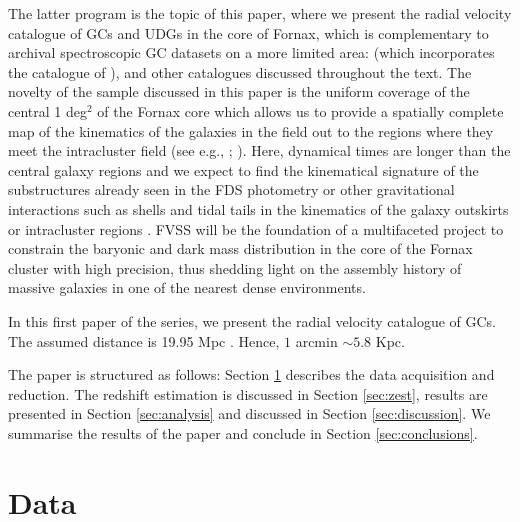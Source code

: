 \documentclass[usenatbib]{mnras}
\begin{document}
The latter program is the topic of this paper, where we present the radial 
velocity catalogue of GCs and UDGs in the core of Fornax, which is 
complementary to archival spectroscopic GC datasets on a more limited area: 
\citet{Schuberth} (which incorporates the catalogue of \citealt{Dirsch04}), 
\citet{Bergond07} and other catalogues discussed throughout the 
text. The novelty of the sample discussed in this paper is the uniform coverage 
of the central 1 deg$^2$ of the Fornax core which allows us to provide a 
spatially complete map of the kinematics of the galaxies in the field out to 
the regions where they meet the intracluster field (see e.g., \citealt{napolitano03}; 
\citealt{arnaboldi12}). Here, dynamical times are longer than the central 
galaxy regions and we expect to find the kinematical signature of the 
substructures already seen in the FDS photometry \citep{Iodice16} or other 
gravitational interactions such as shells and tidal tails in the kinematics of 
the galaxy outskirts or intracluster regions 
\citep{napolitano02,napolitano03, murante07, bullock05, rudick06, duc11, Longobardi15}. 
FVSS will be the foundation of a multifaceted project to constrain the baryonic and dark 
mass distribution in the core of the Fornax cluster with high precision, thus 
shedding light on the assembly history of massive galaxies in one of the 
nearest dense environments.

In this first paper of the series, we present the radial velocity catalogue of GCs. 
The assumed distance is 19.95 Mpc \citep{Tonry01}. Hence, $1$ arcmin $\sim 5.8$ Kpc.

The paper is structured as follows: Section \ref{sec:data} describes the data 
acquisition and reduction. The redshift estimation is discussed in Section 
\ref{sec:zest}, results are presented in Section \ref{sec:analysis} and 
discussed in Section \ref{sec:discussion}. We summarise the results of the paper and 
conclude in Section \ref{sec:conclusions}. 

\section{Data}
\label{sec:data}
\end{document}
